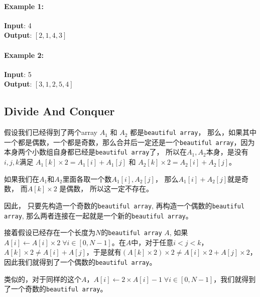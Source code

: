 \documentclass[a4paper,12pt]{article}
\begin{document}
\paragraph{Example 1:}
\begin{flushleft}
\textbf{Input}: 4
\\
\textbf{Output}: $[2,1,4,3]$
\end{flushleft}
\paragraph{Example 2:}
\begin{flushleft}
\textbf{Input}: 5
\\
\textbf{Output}: $[3,1,2,5,4]$
\end{flushleft}
\subsection{Divide And Conquer}
\begin{CJK*}{UTF8}{gbsn}
假设我们已经得到了两个array $A_1$ 和 $A_2$ 都是\texttt{beautiful array}， 那么，如果其中一个都是偶数，一个都是奇数，那么合并后一定还是一个\texttt{beautiful array}，因为本身两个小数组自身都已经是\texttt{beautiful array}了， 所以在$A_1, A_2$本身，是没有$i,j,k$满足 $A_1[k] \times 2 = A_1[i] + A_1[j]$ 和 $A_2[k] \times 2 = A_2[i] + A_2[j]$。
\par
如果我们在$A_1$和$A_2$里面各取一个数$A_1[i], A_2[j]$， 那么$A_1[i] + A_2[j]$就是奇数， 而$A[k]\times 2$ 是偶数， 所以这一定不存在。
\par
因此， 只要先构造一个奇数的\texttt{beautiful array}, 再构造一个偶数的\texttt{beautiful array}, 那么两者连接在一起就是一个新的\texttt{beautiful array}。
\par
接着假设已经存在一个长度为$N$的\texttt{beautiful array} $A$, 如果$A[i]\gets A[i]\times 2\; \forall i\in [0,N-1]$。在$A$中，对于任意$i<j<k$，$A[k]\times 2 \neq A[i] + A[j]$，于是就有$(A[k]\times2)\times2 \neq A[i]\times 2+ A[j]\times 2$，因此我们就得到了一个偶数的\texttt{beautiful array}。
\par
类似的，对于同样的这个$A$，$A[i] \gets 2\times A[i]-1\; \forall i \in [0, N-1]$，我们就得到了一个奇数的\texttt{beautiful array}。
\end{CJK*}
\end{document}
